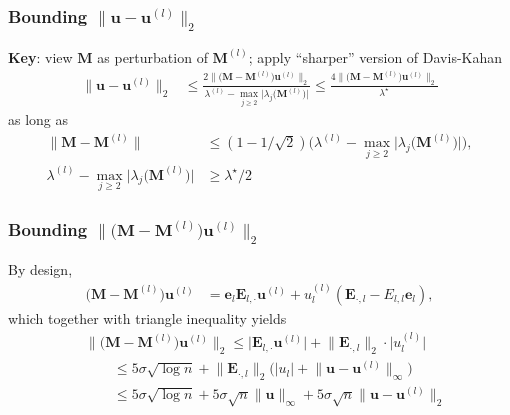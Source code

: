 \documentclass[compress,
mathserif,wide,%
]{beamer}
\begin{document}
\begin{frame}
	\frametitle{Bounding $\|\bm{u} - \bm{u}^{(l)}\|_{2}$}
	{\bf Key}: view $\bm{M}$ as perturbation of $\bm{M}^{(l)}$; apply ``sharper'' version of Davis-Kahan
\begin{align*}
	\big\|\bm{u}-\bm{u}^{(l)}\big\|_{2} &
	\leq\frac{2\|\big(\bm{M}-\bm{M}^{(l)}\big)\bm{u}^{(l)}\|_{2}}{\lambda^{(l)}- \max\limits_{j\geq 2}\big| \lambda_{j}\big(\bm{M}^{(l)}\big) \big| }
	\leq \frac{4\|\big(\bm{M}-\bm{M}^{(l)}\big)\bm{u}^{(l)}\|_{2}}{\lambda^{\star}}
\end{align*}
as long as 
\begin{align*}
\|\bm{M}-\bm{M}^{(l)}\| & \leq (1 - 1 / \sqrt{2}) \Big(\lambda^{(l)}-  \max_{j\geq 2}\big| \lambda_{j}\big(\bm{M}^{(l)}\big) \big| \Big), \\
\lambda^{(l)}-  \max_{j\geq 2}\big| \lambda_{j}\big(\bm{M}^{(l)}\big) \big| & \geq\lambda^{\star}/2 
\end{align*}

\end{frame}

\begin{frame}
	\frametitle{Bounding $\|\big(\bm{M}-\bm{M}^{(l)}\big)\bm{u}^{(l)}\|_{2}$}
By design, 	
\begin{align*}
\big(\bm{M}-\bm{M}^{(l)}\big)\bm{u}^{(l)} & =\bm{e}_{l}\bm{E}_{l,\cdot}\bm{u}^{(l)}+u_{l}^{(l)}(\bm{E}_{\cdot,l} - E_{l,l}\bm{e}_{l}),
\end{align*}
which together with triangle inequality yields
\begin{align*}
 & \|\big(\bm{M}-\bm{M}^{(l)}\big)\bm{u}^{(l)}\|_{2}
	\leq \big|\bm{E}_{l,\cdot}\bm{u}^{(l)}\big|  +
	 \big\|\bm{E}_{\cdot,l}\big\|_{2} \cdot \big|u_{l}^{(l)}\big| \\
 & \qquad \leq5\sigma\sqrt{\log n}+\big\|\bm{E}_{\cdot,l}\big\|_{2}\big(\big|u_{l}\big|+\big\|\bm{u}-\bm{u}^{(l)}\big\|_{\infty}\big)\\
 & \qquad \leq5\sigma\sqrt{\log n}+5\sigma\sqrt{n}\|\bm{u}\|_{\infty}+5\sigma\sqrt{n}\big\|\bm{u}-\bm{u}^{(l)}\big\|_{2}
\end{align*}
\end{frame}
\end{document}
